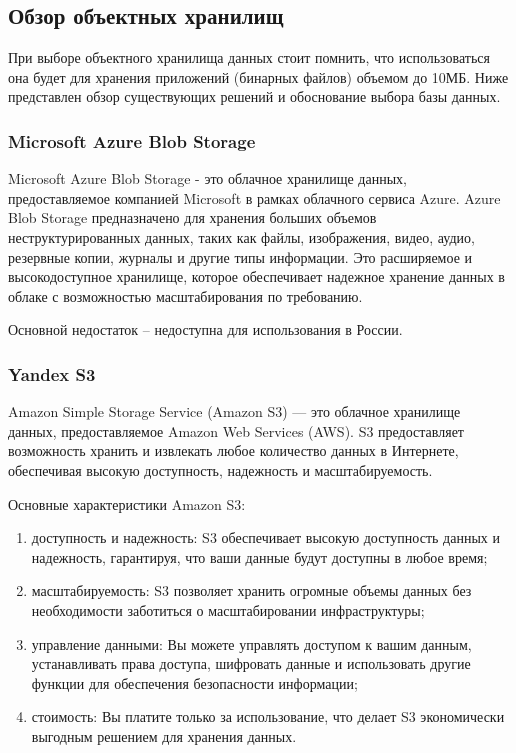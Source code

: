 \subsection{Обзор объектных хранилищ}

При выборе объектного хранилища данных стоит помнить, что использоваться она будет для хранения приложений (бинарных файлов) объемом до 10МБ. Ниже представлен обзор существующих решений и обоснование выбора базы данных.

\subsubsection{Microsoft Azure Blob Storage}

Microsoft Azure Blob Storage - это облачное хранилище данных, предоставляемое компанией Microsoft в рамках облачного сервиса Azure. Azure Blob Storage предназначено для хранения больших объемов неструктурированных данных, таких как файлы, изображения, видео, аудио, резервные копии, журналы и другие типы информации. Это расширяемое и высокодоступное хранилище, которое обеспечивает надежное хранение данных в облаке с возможностью масштабирования по требованию.

Основной недостаток -- недоступна для использования в России.


\subsubsection{Yandex S3}

Amazon Simple Storage Service (Amazon S3) --- это облачное хранилище данных, предоставляемое Amazon Web Services (AWS). S3 предоставляет возможность хранить и извлекать любое количество данных в Интернете, обеспечивая высокую доступность, надежность и масштабируемость.

Основные характеристики Amazon S3:

\begin{enumerate}
	
	\item доступность и надежность: S3 обеспечивает высокую доступность данных и надежность, гарантируя, что ваши данные будут доступны в любое время;
	
	\item масштабируемость: S3 позволяет хранить огромные объемы данных без необходимости заботиться о масштабировании инфраструктуры;
	
	\item управление данными: Вы можете управлять доступом к вашим данным, устанавливать права доступа, шифровать данные и использовать другие функции для обеспечения безопасности информации;
	
	\item стоимость: Вы платите только за использование, что делает S3 экономически выгодным решением для хранения данных.
\end{enumerate}

